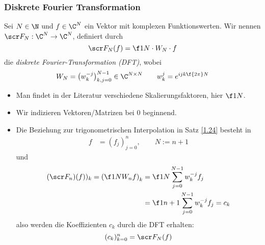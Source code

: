 \documentclass[11pt]{scrartcl}
\begin{document}
\subsubsection{Diskrete Fourier Transformation}

\begin{df} \label{1.26}
	Sei $N\in \N$ und $f\in \C^N$ ein Vektor mit komplexen Funktionswerten.
	Wir nennen $\scr F_N: \C^N \to \C^N$, definiert durch
	\[
		\scr F_N(f) = \f 1N \cdot W_N \cdot f
	\]
	die \emph{diskrete Fourier-Transformation (DFT)}, wobei
	\[
		W_N = \big(w_{k}^{-j}\big)_{k,j=0}^{N-1} \in \C^{N\times N} \qquad w_{k}^j = e^{ijk \f {2\pi}N}
	\]
	\begin{note}
		\begin{itemize}
			\item
				Man findet in der Literatur verschiedene Skalierungsfaktoren, hier $\f 1N$.
			\item
				Wir indizieren Vektoren/Matrizen bei $0$ beginnend.		
			\item
				Die Beziehung zur trigonometrischen Interpolation in Satz \ref{1.24} besteht in
				\begin{align*}
					f &= (f_j)_{j=0}^n, \qquad N:= n+1
				\end{align*}
				und
				\begin{align*}
					(\scr F_n)(f))_k = \left( \f 1N W_n f\right)_k &= \f 1N \sum_{j=0}^{N-1}w_k^{-j} f_j \\
					&= \f 1{n+1} \sum_{j=0}^{N-1}w_k^{-j} f_j = c_k
				\end{align*}
				also werden die Koeffizienten $c_k$ durch die DFT erhalten:
				\[
					(c_k)_{k=0}^n = \scr F_N(f)
				\]
		\end{itemize}
	\end{note}
\end{df}
\end{document}
